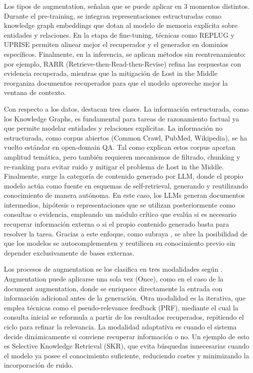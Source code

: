 Los tipos de augmentation, \textcite{zhao2024rag} señalan que se puede aplicar en 3 momentos distintos. Durante el pre-training, se integran representaciones estructuradas 
como knowledge graph embeddings que dotan al modelo de memoria explícita sobre entidades y relaciones. En la etapa de fine-tuning, técnicas como REPLUG y UPRISE 
permiten alinear mejor el recuperador y el generador en dominios específicos. Finalmente, en la inferencia, se aplican métodos sin reentrenamiento: por ejemplo, 
RARR (Retrieve-then-Read-then-Revise) refina las respuestas con evidencia recuperada, mientras que la mitigación de Lost in the Middle reorganiza documentos recuperados
para que el modelo aproveche mejor la ventana de contexto.

Con respecto a los datos, \textcite{fan2024ragllm} destacan tres clases. La información estructurada, como los Knowledge Graphs, es fundamental para tareas de razonamiento 
factual ya que permite modelar entidades y relaciones explícitas. La información no estructurada, como corpus abiertos (Common Crawl, PubMed, Wikipedia), se ha vuelto estándar en open-domain QA.
Tal como explican \textcite{gao2023rag} estos corpus aportan amplitud temática, pero también requieren mecanismos de filtrado, chunking y re-ranking 
para evitar ruido y mitigar el problema de Lost in the Middle. Finalmente, surge la categoría de contenido generado por LLM, donde el propio modelo actúa 
como fuente en esquemas de self-retrieval, generando y reutilizando conocimiento de manera autónoma. En este caso, los LLMs generan documentos intermedios, 
hipótesis o representaciones que se utilizan posteriormente como consultas o evidencia, empleando un módulo crítico que evalúa si es necesario recuperar información externa o 
si el propio contenido generado basta para resolver la tarea. Gracias a este enfoque, como subraya \textcite{fan2024ragllm}, se abre la posibilidad de que los modelos se autocomplementen y 
reutilicen su conocimiento previo sin depender exclusivamente de bases externas.

Los procesos de augmentation se los clasifica en tres modalidades según \textcite{zhao2024rag}. 
Augmentation puede aplicarse una sola vez (Once), como en el caso de la document augmentation, 
donde se enriquece directamente la entrada con información adicional antes de la generación. 
Otra modalidad es la iterativa, que emplea técnicas como el pseudo-relevance feedback (PRF), 
mediante el cual la consulta inicial se reformula a partir de los resultados recuperados, repitiendo el ciclo 
para refinar la relevancia. 
La modalidad adaptativa es cuando el sistema decide dinámicamente si conviene recuperar 
información o no. Un ejemplo de esto es Selective Knowledge Retrieval (SKR), que evita búsquedas 
innecesarias cuando el modelo ya posee el conocimiento suficiente, reduciendo costes y minimizando la 
incorporación de ruido.


